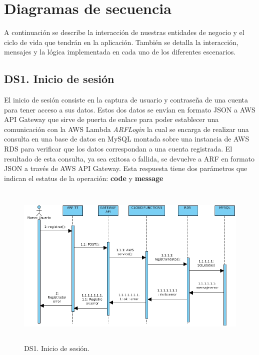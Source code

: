 \newpage
\section{Diagramas de secuencia}
A continuación se describe la interacción de nuestras entidades de negocio y el ciclo de vida que tendrán en la aplicación. También se detalla la interacción, mensajes y la lógica implementada en cada uno de los diferentes escenarios.\par

\subsection{DS1. Inicio de sesión}
El inicio de sesión consiste en la captura de usuario y contraseña de una cuenta para tener acceso a sus datos. Estos dos datos se envían en formato JSON a AWS API Gateway que sirve de puerta de enlace para poder establecer una comunicación con la AWS Lambda \textit{ARFLogin} la cual se encarga de realizar una consulta en una base de datos en MySQL montada sobre una instancia de AWS RDS para verificar que los datos correspondan a una cuenta registrada. El resultado de esta consulta, ya sea exitosa o fallida, se devuelve a ARF en formato JSON a través de AWS API Gateway. Esta respuesta tiene dos parámetros que indican el estatus de la operación: \textbf{code} y \textbf{message}

\begin{figure}[h!]
	\centering
	\includegraphics[width=14cm,height=8cm]{imagenes/analisis/DSregistrarUsuario.jpg}
	\caption{DS1. Inicio de sesión.}
	\label{fig:dsiniciosesion}
\end{figure}